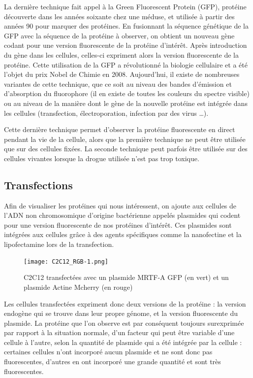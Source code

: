 	La dernière technique fait appel à la Green Fluorescent Protein (GFP), protéine découverte dans les années soixante chez une méduse, et utilisée à partir des années 90 pour marquer des protéines. En fusionnant la séquence génétique de la GFP avec la séquence de la protéine à observer, on obtient un nouveau gène codant pour une version fluorescente de la protéine d'intérêt. Après introduction du gène dans les cellules, celles-ci expriment alors la version fluorescente de la protéine. Cette utilisation de la GFP a révolutionné la biologie cellulaire et a été l'objet du prix Nobel de Chimie en 2008. Aujourd'hui, il existe de nombreuses variantes de cette technique, que ce soit au niveau des bandes d'émission et d'absorption du fluorophore (il en existe de toutes les couleurs du spectre visible) ou au niveau de la manière dont le gène de la nouvelle protéine est intégrée dans les cellules (transfection, électroporation, infection par des virus  \dots).
	
	Cette dernière technique permet d'observer la protéine fluorescente en direct pendant la vie de la cellule, alors que la première technique ne peut être utilisée que sur des cellules fixées. La seconde technique peut parfois être utilisée sur des cellules vivantes lorsque la drogue utilisée n'est pas trop toxique. 
	\subsection{Transfections}
	Afin de visualiser les protéines qui nous intéressent, on ajoute aux cellules de l'ADN non chromosomique d'origine bactérienne appelés plasmides qui codent pour une version fluorescente de nos protéines d'intérêt. Ces plasmides sont intégrées aux cellules grâce à des agents spécifiques comme la nanofectine et la lipofectamine lors de la transfection. 
	
	\begin{figure}
	\texttt{[image: C2C12\_RGB-1.png]}
	\caption{C2C12 transfectées avec un plasmide MRTF-A GFP (en vert) et un plasmide Actine Mcherry (en rouge)}
	\end{figure}
	
	Les cellules transfectées expriment donc deux versions de la protéine : la version endogène qui se trouve dans leur propre génome, et la version fluorescente du plasmide. La protéine que l'on observe est par conséquent toujours surexprimée par rapport à la situation normale, d'un facteur qui peut être variable d'une cellule à l'autre, selon la quantité de plasmide qui a été intégrée par la cellule : certaines cellules n'ont incorporé aucun plasmide et ne sont donc pas fluorescentes, d'autres en ont incorporé une grande quantité et sont très fluorescentes. 
	

